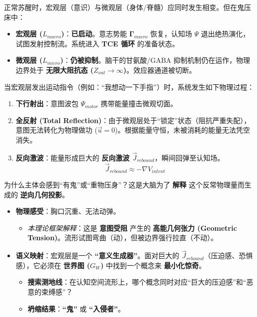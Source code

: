 
正常苏醒时，宏观层（意识）与微观层（身体/脊髓）应同时发生相变。但在鬼压床中：

\begin{itemize}
    \item \textbf{宏观层 ($L_{macro}$)}：\textbf{已启动}。意志势能 $\mathbf{\Gamma}_{macro}$ 恢复，认知场 $\Psi$ 退出绝热演化，试图发射控制流。系统进入 \textbf{TCE 循环} 的准备状态。
    \item \textbf{微观层 ($L_{micro}$)}：\textbf{仍被抑制}。脑干的甘氨酸/GABA 抑制机制仍在运作，物理边界处于 \textbf{无限大阻抗态 ($Z_{out} \to \infty$)}。效应器通道被切断。
\end{itemize}


当宏观层发出运动指令（例如：“我想动一下手指”）时，系统发生如下物理过程：

\begin{enumerate}
    \item \textbf{下行射出}：意图波包 $\Psi_{motor}$ 携带能量撞击微观切面。
    \item \textbf{全反射 (Total Reflection)}：由于微观层处于“锁定”状态（阻抗严重失配），意图无法转化为物理做功 ($\vec{u} = 0$)。根据能量守恒，未被消耗的能量无法凭空消失。
    \item \textbf{反向激波}：能量形成巨大的 \textbf{反向激波 $\vec{J}_{rebound}$}，瞬间回弹至认知场。
    \begin{equation}
    \vec{J}_{rebound} \approx - \nabla V_{intent}
    \end{equation}
\end{enumerate}


为什么主体会感到“有鬼”或“重物压身”？这是大脑为了 \textbf{解释} 这个反常物理量而生成的 \textbf{逆向几何投影}。

\begin{itemize}
    \item \textbf{物理感受}：胸口沉重、无法动弹。
    \begin{itemize}
        \item \textit{本理论框架解释}：这是 \textbf{意图受阻} 产生的 \textbf{高能几何张力 (Geometric Tension)}。流形试图弯曲（动），但被边界强行拉直（不动）。
    \end{itemize}
    \item \textbf{语义映射}：宏观层是一个 \textbf{“意义生成器”}。面对巨大的 $\vec{J}_{rebound}$（压迫感、恐惧感），它必须在 \textbf{世界图 ($G_W$)} 中找到一个概念来 \textbf{最小化惊奇}。
    \begin{itemize}
        \item \textbf{搜索测地线}：在认知空间流形上，哪个概念同时对应“巨大的压迫感”和“恶意的束缚感”？
        \item \textbf{坍缩结果}：\textbf{“鬼”} 或 \textbf{“入侵者”}。
    \end{itemize}
\end{itemize}

